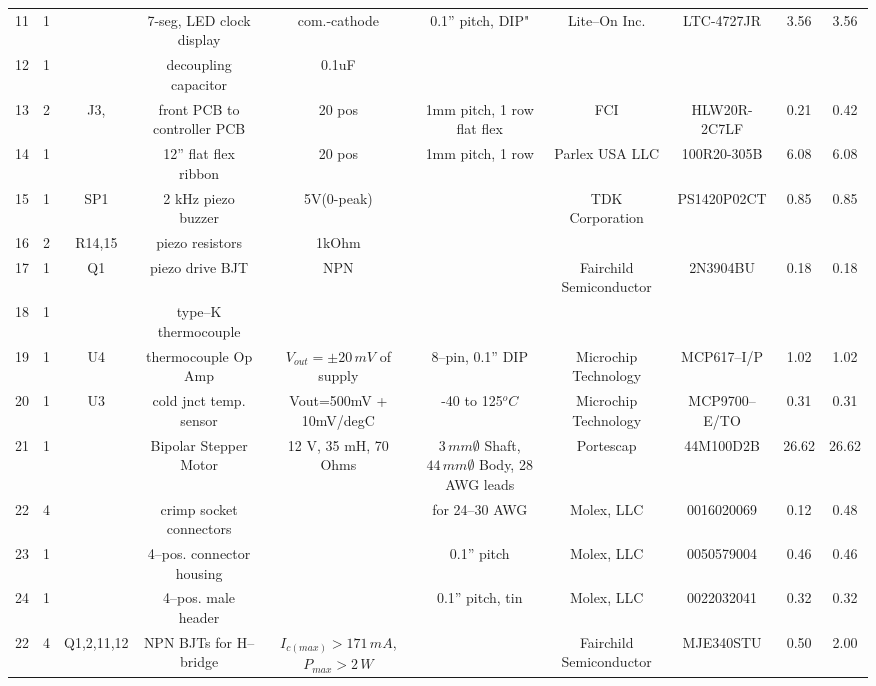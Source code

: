\documentclass[10pt, twocolumn]{article}
\begin{document}
\begin{center}
\begin{adjustbox}{max width=\textwidth}
\begin{tabular}{c c c c c c c c c c}
11	&1	&	&7-seg, LED clock display	&com.-cathode	&0.1” pitch, DIP"
	&Lite--On Inc.		&LTC-4727JR		&3.56		&3.56	\\

12	&1	&	&decoupling capacitor	&0.1uF				&
	&		&				&		&	\\

13	&2	&J3,	&front PCB to controller PCB	&20 pos			&1mm pitch, 1 row flat flex
	&FCI			&HLW20R-2C7LF		&0.21		&0.42	\\

14	&1	&	&12” flat flex ribbon		&20 pos		&1mm pitch, 1 row
	&Parlex USA LLC		&100R20-305B		&6.08		&6.08	\\

15	&1	&SP1	&2 kHz piezo buzzer	&5V(0-peak)			&
	&TDK Corporation	&PS1420P02CT		&0.85		&0.85	\\

16	&2	&R14,15	&piezo resistors	&1kOhm				&
	&			&			&		&	\\

17	&1	&Q1	&piezo drive BJT		&NPN				&
	&Fairchild Semiconductor	&2N3904BU	&0.18		&0.18	\\

18	&1	&	&type--K thermocouple	&				&
	&			&			&		&	\\

19	&1	&U4	&thermocouple Op Amp	&$V_{out}=\pm 20\,mV$ of supply	&8--pin, 0.1” DIP
	&Microchip Technology	&MCP617--I/P		&1.02		&1.02	\\

20	&1	&U3	&cold jnct temp. sensor	&Vout=500mV + 10mV/degC 	&-40 to 125$^{o}C$
	&Microchip Technology	&MCP9700--E/TO		&0.31		&0.31	\\

21	&1	&	&Bipolar Stepper Motor	&12 V, 35 mH, 70 Ohms		&$3\,mm\emptyset$ Shaft, $44\,mm\emptyset$ Body, 28 AWG leads
	&Portescap		&44M100D2B		&26.62		&26.62	\\

22	&4	&	&crimp socket connectors	&			&for 24--30 AWG
	&Molex, LLC		&0016020069		&0.12		&0.48	\\

23	&1	&	&4--pos. connector housing	&			&0.1'' pitch
	&Molex, LLC		&0050579004		&0.46		&0.46	\\

24	&1	&	&4--pos. male header	&				&0.1'' pitch, tin
	&Molex, LLC		&0022032041		&0.32		&0.32	\\

22	&4	&Q1,2,11,12	&NPN BJTs for H--bridge	&$I_{c(max)}>171\,mA$, $P_{max}>2\,W$	&
	&Fairchild Semiconductor	&MJE340STU	&0.50		&2.00	\\


\end{tabular}
\end{adjustbox}
\end{center}
\end{document}
